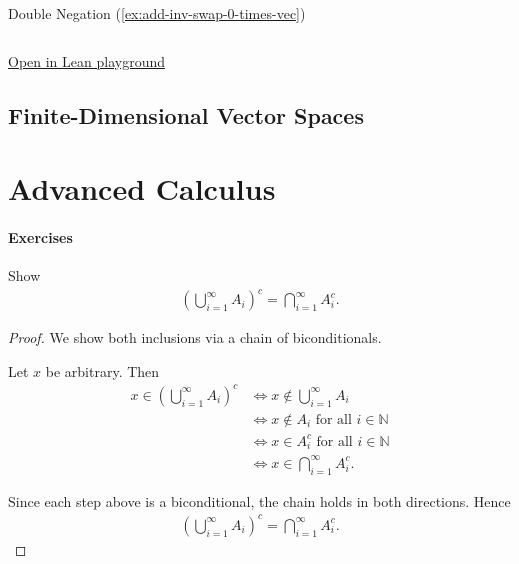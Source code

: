 \documentclass[12pt]{book}
\begin{document}
\begin{leanbox}{Double Negation (\ref{ex:add-inv-swap-0-times-vec})} \label{lean:add-inv-swap-0-times-vec}
\begin{verbatim}

\end{verbatim}
\href{}{Open in Lean playground}
\end{leanbox}




\section{Finite-Dimensional Vector Spaces}

\begin{definition}
    
\end{definition}








\chapter{Advanced Calculus}


\subsubsection*{Exercises}

\begin{exercise}
    Show 
    \begin{align*}
        \left(\bigcup_{i=1}^{\infty} A_i\right)^c = \bigcap_{i=1}^{\infty} A_i^c.
    \end{align*}
\end{exercise}

\begin{proof}
    We show both inclusions via a chain of biconditionals.

    Let $x$ be arbitrary. Then
    \begin{align*}
        x \in \left(\bigcup_{i=1}^{\infty} A_i\right)^c
        &\iff x \notin \bigcup_{i=1}^{\infty} A_i \\
        &\iff x \notin A_i \text{ for all } i \in \mathbb{N} \\
        &\iff x \in A_i^c \text{ for all } i \in \mathbb{N} \\
        &\iff x \in \bigcap_{i=1}^{\infty} A_i^c.
    \end{align*}

    Since each step above is a biconditional, the chain holds in both directions. Hence
    \begin{align*}
        \left(\bigcup_{i=1}^{\infty} A_i\right)^c = \bigcap_{i=1}^{\infty} A_i^c.
    \end{align*}
\end{proof}
\end{document}
